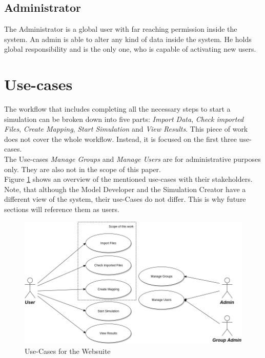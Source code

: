 \subsection{Administrator}
The Administrator is a global user with far reaching permission inside the system. An admin is able to alter any kind of data inside the system. He holds global responsibility and is the only one, who is capable of activating new users.


\section{Use-cases}
The workflow that includes completing all the necessary steps to start a simulation can be broken down into five parts: \textit{Import Data}, \textit{Check imported Files}, \textit{Create Mapping}, \textit{Start Simulation} and \textit{View Results}. This piece of work does not cover the whole workflow. Instead, it is focused on the first three use-cases.\\
The Use-cases \textit{Manage Groups} and \textit{Manage Users} are for administrative purposes only. They are also not in the scope of this paper.\\
Figure \ref{fig:use-cases} shows an overview of the mentioned use-cases with their stakeholders. Note, that although the Model Developer and the Simulation Creator have a different view of the system, their use-Cases do not differ. This is why future sections will reference them as users.
\begin{figure}[H]
	\centering\includegraphics[width=1\textwidth]{res/Use-Cases_reduced}
	\caption{Use-Cases for the Websuite}
	\label{fig:use-cases}
\end{figure}

